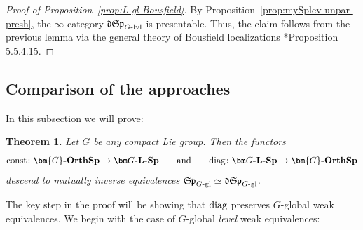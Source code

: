 \documentclass[reqno]{memo-l}
\theoremstyle{mythm}
\newtheorem{thm}{Theorem}[section]
\theoremstyle{definition}
\numberwithin{equation}{section}
\newcommand{\cat}[1]{\textbf{\textup{#1}}}
\newcommand{\consts}{\textup{const}}
\newcommand{\diag}{\textup{diag}}
\newcommand{\mySp}{{\mathfrak S\kern-.5pt\mathfrak p}}
\newcommand{\myLSp}{{\mathfrak d\kern-.25pt}\mySp}
\newcommand{\Gosp}[1]{\cat{$\bm{#1}$-OrthSp}}
\begin{document}
\begin{proof}[Proof of Proposition~\ref{prop:L-gl-Bousfield}]
    By Proposition~\ref{prop:mySplev-unpar-presh}, the $\infty$-category $\myLSp_\text{$G$-lvl}$ is presentable. Thus, the claim follows from the previous lemma via the general theory of Bousfield localizations \cite{HTT}*{Proposition 5.5.4.15}. 
\end{proof}

\subsection{Comparison of the approaches} \label{subsec:comp-spectra}
In this subsection we will prove:

\begin{thm}\label{thm:comp-gl-models}
    Let $G$ be any compact Lie group. Then the functors 
    \[
        \consts\colon\Gosp{G}\to\cat{$\bm G$-$\cat{L}$-Sp}
        \qquad\text{and}
        \qquad
        \diag\colon\cat{$\bm G$-$\cat{L}$-Sp}\to\Gosp{G}
    \]
    descend to mutually inverse equivalences $\mySp_\textup{$G$-gl}\simeq\myLSp_\textup{$G$-gl}$.
\end{thm}

The key step in the proof will be showing that $\diag$ preserves $G$-global weak equivalences. We begin with the case of $G$-global \emph{level} weak equivalences:
\end{document}

